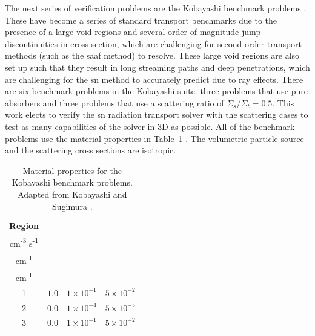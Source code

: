 The next series of verification problems are the Kobayashi benchmark problems \cite{kobayashi_benchmarks}. These have become a series of standard transport benchmarks due to the presence of a large void regions and several order of magnitude jump discontinuities in cross section, which are challenging for second order transport methods (such as the \acrshort{saaf} method) to resolve. These large void regions are also set up such that they result in long streaming paths and deep penetrations, which are challenging for the \acrshort{sn} method to accurately predict due to ray effects. There are six benchmark problems in the Kobayashi suite: three problems that use pure absorbers and three problems that use a scattering ratio of $\Sigma_{s} / \Sigma_{t} = 0.5$. This work elects to verify the \acrshort{sn} radiation transport solver with the scattering cases to test as many capabilities of the solver in 3D as possible. All of the benchmark problems use the material properties in Table~\ref{table:kobayashi_props} \cite{kobayashi_benchmarks}. The volumetric particle source and the scattering cross sections are isotropic.
\begin{table}[H]
    \centering
    \singlespacing
    \caption[Material properties for the Kobayashi benchmark problems.]{Material properties for the Kobayashi benchmark problems. Adapted from Kobayashi and Sugimura \cite{kobayashi_benchmarks}.}
    \begin{tabular}{|cccc|}
        \hline
        \textbf{Region} & \makecell{$Q^{\text{ext}}$ \\ cm\textsuperscript{-3} s\textsuperscript{-1}} & \makecell{$\Sigma_{t}$ \\ cm\textsuperscript{-1}}  & \makecell{$\Sigma_{s}$ \\ cm\textsuperscript{-1}} \\
        \hline
        1 & $1.0$ & $1\times10^{-1}$ & $5\times 10^{-2}$\\
        2 & $0.0$ & $1\times10^{-4}$ & $5\times 10^{-5}$\\
        3 & $0.0$ & $1\times10^{-1}$ & $5\times 10^{-2}$\\
        \hline
    \end{tabular}
    \label{table:kobayashi_props}
\end{table}

